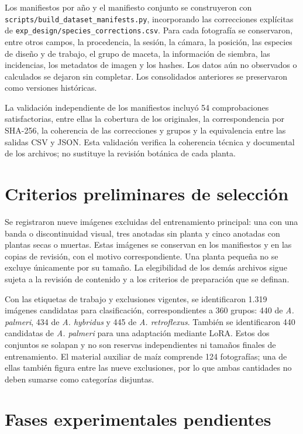 Los manifiestos por año y el manifiesto conjunto se construyeron con \texttt{scripts/build\_dataset\_manifests.py}, incorporando las correcciones explícitas de \texttt{exp\_design/species\_corrections.csv}. Para cada fotografía se conservaron, entre otros campos, la procedencia, la sesión, la cámara, la posición, las especies de diseño y de trabajo, el grupo de maceta, la información de siembra, las incidencias, los metadatos de imagen y los hashes. Los datos aún no observados o calculados se dejaron sin completar. Los consolidados anteriores se preservaron como versiones históricas.

La validación independiente de los manifiestos incluyó 54 comprobaciones satisfactorias, entre ellas la cobertura de los originales, la correspondencia por SHA-256, la coherencia de las correcciones y grupos y la equivalencia entre las salidas CSV y JSON. Esta validación verifica la coherencia técnica y documental de los archivos; no sustituye la revisión botánica de cada planta.

\section{Criterios preliminares de selección}

Se registraron nueve imágenes excluidas del entrenamiento principal: una con una banda o discontinuidad visual, tres anotadas sin planta y cinco anotadas con plantas secas o muertas. Estas imágenes se conservan en los manifiestos y en las copias de revisión, con el motivo correspondiente. Una planta pequeña no se excluye únicamente por su tamaño. La elegibilidad de los demás archivos sigue sujeta a la revisión de contenido y a los criterios de preparación que se definan.

Con las etiquetas de trabajo y exclusiones vigentes, se identificaron 1.319 imágenes candidatas para clasificación, correspondientes a 360 grupos: 440 de \textit{A. palmeri}, 434 de \textit{A. hybridus} y 445 de \textit{A. retroflexus}. También se identificaron 440 candidatas de \textit{A. palmeri} para una adaptación mediante LoRA. Estos dos conjuntos se solapan y no son reservas independientes ni tamaños finales de entrenamiento. El material auxiliar de maíz comprende 124 fotografías; una de ellas también figura entre las nueve exclusiones, por lo que ambas cantidades no deben sumarse como categorías disjuntas.

\section{Fases experimentales pendientes}

